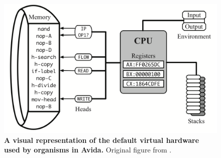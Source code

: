 
\begin{figure}[!t]
  \centering
  \includegraphics[width=\textwidth]{chapters/02-evolutionary-origins-of-plasticity/media/avida-virtual-cpu.png}
  \caption{\small 
    \textbf{A visual representation of the default virtual hardware used by organisms in Avida. }
    Original figure from \citep{ofria_avida:_2009}.
  }
  \label{chapter:origins-of-plasticity:fig:avida-virtual-cpu}
\end{figure}